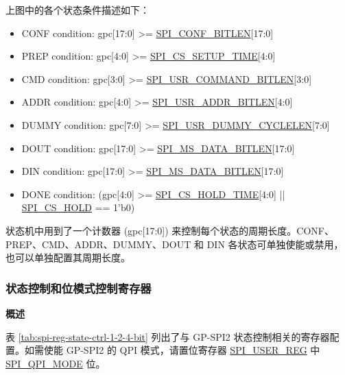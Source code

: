 \documentclass[main\_\_CN.tex]{subfiles}
\begin{document}
上图中的各个状态条件描述如下：
\begin{itemize}
    \item CONF condition: gpc[17:0] >= \hyperref[fielddesc:SPICONFBITLEN]{SPI\_CONF\_BITLEN}[17:0]
    \item PREP condition: gpc[4:0] >= \hyperref[fielddesc:SPICSSETUPTIME]{SPI\_CS\_SETUP\_TIME}[4:0]
    \item CMD condition: gpc[3:0] >= \hyperref[fielddesc:SPIUSRCOMMANDBITLEN]{SPI\_USR\_COMMAND\_BITLEN}[3:0]
    \item ADDR condition: gpc[4:0] >= \hyperref[fielddesc:SPIUSRADDRBITLEN]{SPI\_USR\_ADDR\_BITLEN}[4:0]
    \item DUMMY condition: gpc[7:0] >= \hyperref[fielddesc:SPIUSRDUMMYCYCLELEN]{SPI\_USR\_DUMMY\_CYCLELEN}[7:0]
    \item DOUT condition: gpc[17:0] >= \hyperref[fielddesc:SPIMSDATABITLEN]{SPI\_MS\_DATA\_BITLEN}[17:0]
    \item DIN condition: gpc[17:0] >= \hyperref[fielddesc:SPIMSDATABITLEN]{SPI\_MS\_DATA\_BITLEN}[17:0]

    \item DONE condition: (gpc[4:0] >= \hyperref[fielddesc:SPICSHOLDTIME]{SPI\_CS\_HOLD\_TIME}[4:0] || \hyperref[fielddesc:SPICSHOLD]{SPI\_CS\_HOLD} == 1'b0)

\end{itemize}





状态机中用到了一个计数器 (gpc[17:0]) 来控制每个状态的周期长度。CONF、PREP、CMD、ADDR、DUMMY、DOUT 和 DIN 各状态可单独使能或禁用，也可以单独配置其周期长度。

\subsubsection{状态控制和位模式控制寄存器} \label{sec:spi-reg-config-state-bit-mode-ctrl}

\textbf{概述}

表  \ref{tab:spi-reg-state-ctrl-1-2-4-bit} 列出了与 GP-SPI2 状态控制相关的寄存器配置。如需使能 GP-SPI2 的 QPI 模式，请置位寄存器 \hyperref[regdesc:SPIUSERREG]{SPI\_USER\_REG} 中 \hyperref[fielddesc:SPIQPIMODE]{SPI\_QPI\_MODE} 位。
\end{document}
